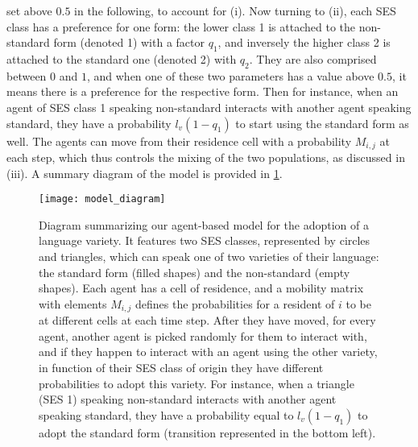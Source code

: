 \documentclass[../thesis.tex]{subfiles}
\begin{document}
set above $0.5$ in the following, to account for (i). Now turning to (ii), each \ac{SES}
class has a preference for one form: the lower class 1 is attached to the non-standard
form (denoted 1) with a factor $q_1$, and inversely the higher class 2 is attached to
the standard one (denoted 2) with $q_2$. They are also comprised between $0$ and $1$,
and when one of these two parameters has a value above $0.5$, it means there is a
preference for the respective form. Then for instance, when an agent of \ac{SES} class 1
speaking non-standard interacts with another agent speaking standard, they have a
probability $l_v (1 - q_1)$ to start using the standard form as well. The agents can
move from their residence cell with a probability $M_{i,j}$ at each step, which thus
controls the mixing of the two populations, as discussed in (iii). A summary diagram of
the model is provided in \cref{fig:ses_ling_model_diagram}.
\begin{figure}
\centering
  \texttt{[image: model\_diagram]}
  \caption{Diagram summarizing our agent-based model for the adoption of a language
  variety. It features two \ac{SES} classes, represented by circles and triangles, which
  can speak one of two varieties of their language: the standard form (filled shapes)
  and the non-standard (empty shapes). Each agent has a cell of residence, and a
  mobility matrix with elements $M_{i, j}$ defines the probabilities for a resident of
  $i$ to be at different cells at each time step. After they have moved, for every
  agent, another agent is picked randomly for them to interact with, and if they happen
  to interact with an agent using the other variety, in function of their \ac{SES} class
  of origin they have different probabilities to adopt this variety. For instance, when
  a triangle (\ac{SES} 1) speaking non-standard interacts with another agent speaking
  standard, they have a probability equal to $l_v (1 - q_1)$ to adopt the standard form
  (transition represented in the bottom left).}
  \label{fig:ses_ling_model_diagram}
\end{figure}
\end{document}
